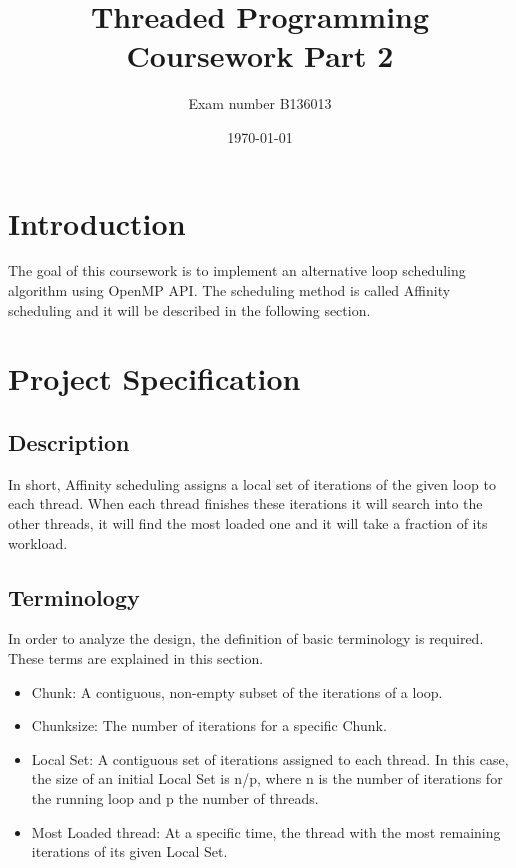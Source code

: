 \documentclass[12pt,a4paper]{article}
\newcommand{\sectionVspacing}{\vspace{15pt}}
\begin{document}
\title{Threaded Programming Coursework Part 2}
\author{Exam number B136013}
\date{\today}

\makeEPCCtitle

\thispagestyle{empty}

\newpage
\clearpage

\tableofcontents

\newpage
\clearpage

\section{Introduction}

The goal of this coursework is to implement an alternative loop scheduling algorithm using OpenMP API. The scheduling method is called Affinity scheduling and it will be described in the following section.

\sectionVspacing

\section{Project Specification}
\subsection{Description}

In short, Affinity scheduling assigns a local set of iterations of the given loop to each thread. When each thread finishes these iterations it will search into the other threads, it will find the most loaded one and it will take a fraction of its workload.

\subsection{Terminology}

In order to analyze the design, the definition of basic terminology is required. These terms are explained in this section.

\begin{itemize}
  \item Chunk: A contiguous, non-empty subset of the iterations of a loop.
  \item Chunksize: The number of iterations for a specific Chunk.
  \item Local Set: A contiguous set of iterations assigned to each thread. In this case, the size of an initial Local Set is n/p, where n is the number of iterations for the running loop and p the number of threads.
  \item Most Loaded thread: At a specific time, the thread with the most remaining iterations of its given Local Set.
\end{itemize}
\end{document}
